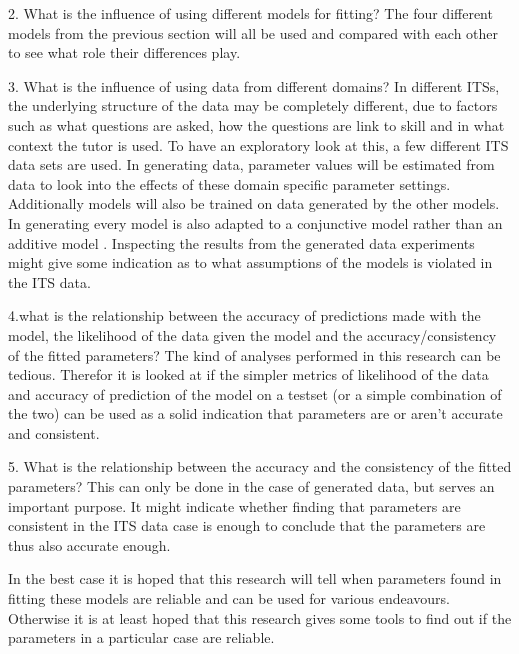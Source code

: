 \documentclass{scrartcl}
\begin{document}
2. What is the influence of using different models for fitting? The four different models from the previous section will all be used and compared with each other to see what role their differences play.

3. What is the influence of using data from different domains? In different ITSs, the underlying structure of the data may be completely different, due to factors such as what questions are asked, how the questions are link to skill and in what context the tutor is used. To have an exploratory look at this, a few different ITS data sets are used. In generating data, parameter values will be estimated from data to look into the effects of these domain specific parameter settings. Additionally models will also be trained on data generated by the other models. In generating every model is also adapted to a conjunctive model rather than an additive model \cite{skillcombi}. Inspecting the results from the generated data experiments might give some indication as to what assumptions of the models is violated in the ITS data.

4.what is the relationship between the accuracy of predictions made with the model, the likelihood of the data given the model and the accuracy/consistency of the fitted parameters? The kind of analyses performed in this research can be tedious. Therefor it is looked at if the simpler metrics of likelihood of the data and accuracy of prediction of the model on a testset (or a simple combination of the two) can be used as a solid indication that parameters are or aren't accurate and consistent.

5. What is the relationship between the accuracy and the consistency of the fitted parameters? This can only be done in the case of generated data, but serves an important purpose. It might indicate whether finding that parameters are consistent in the ITS data case is enough to conclude that the parameters are thus also accurate enough.

In the best case it is hoped that this research will tell when parameters found in fitting these models are reliable and can be used for various endeavours. Otherwise it is at least hoped that this research gives some tools to find out if the parameters in a particular case are reliable.

\end{document}
